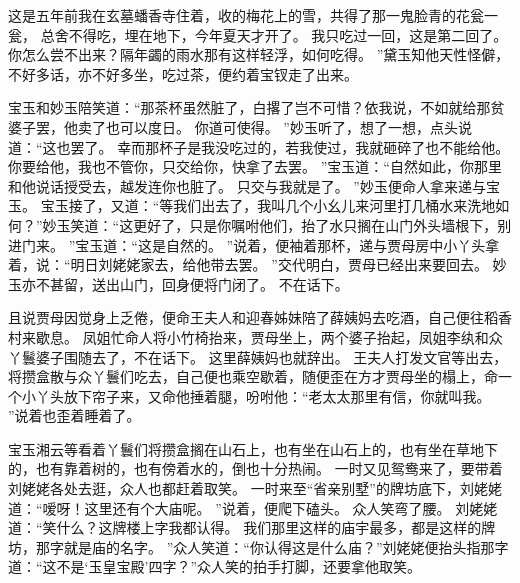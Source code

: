 这是五年前我在玄墓蟠香寺住着，收的梅花上的雪，共得了那一鬼脸青的花瓮一瓮，
总舍不得吃，埋在地下，今年夏天才开了。
我只吃过一回，这是第二回了。
你怎么尝不出来？隔年蠲的雨水那有这样轻浮，如何吃得。
”黛玉知他天性怪僻，不好多话，亦不好多坐，吃过茶，便约着宝钗走了出来。
\par
{}
宝玉和妙玉陪笑道：“那茶杯虽然脏了，白撂了岂不可惜？依我说，不如就给那贫婆子罢，他卖了也可以度日。
你道可使得。
”妙玉听了，想了一想，点头说道：“这也罢了。
幸而那杯子是我没吃过的，若我使过，我就砸碎了也不能给他。
你要给他，我也不管你，只交给你，快拿了去罢。
”宝玉道：“自然如此，你那里和他说话授受去，越发连你也脏了。
只交与我就是了。
”妙玉便命人拿来递与宝玉。
宝玉接了，又道：“等我们出去了，我叫几个小幺儿来河里打几桶水来洗地如何？”妙玉笑道：“这更好了，只是你嘱咐他们，抬了水只搁在山门外头墙根下，别进门来。
”宝玉道：“这是自然的。
”说着，便袖着那杯，递与贾母房中小丫头拿着，说：“明日刘姥姥家去，给他带去罢。
”交代明白，贾母已经出来要回去。
妙玉亦不甚留，送出山门，回身便将门闭了。
不在话下。
\par
且说贾母因觉身上乏倦，便命王夫人和迎春姊妹陪了薛姨妈去吃酒，自己便往稻香村来歇息。
凤姐忙命人将小竹椅抬来，贾母坐上，两个婆子抬起，凤姐李纨和众丫鬟婆子围随去了，不在话下。
这里薛姨妈也就辞出。
王夫人打发文官等出去，将攒盒散与众丫鬟们吃去，自己便也乘空歇着，随便歪在方才贾母坐的榻上，命一个小丫头放下帘子来，又命他捶着腿，吩咐他：“老太太那里有信，你就叫我。
”说着也歪着睡着了。
\par
宝玉湘云等看着丫鬟们将攒盒搁在山石上，也有坐在山石上的，也有坐在草地下的，也有靠着树的，也有傍着水的，倒也十分热闹。
一时又见鸳鸯来了，要带着刘姥姥各处去逛，众人也都赶着取笑。
一时来至“省亲别墅”的牌坊底下，刘姥姥道：“嗳呀！这里还有个大庙呢。
”说着，便爬下磕头。
众人笑弯了腰。
刘姥姥道：“笑什么？这牌楼上字我都认得。
我们那里这样的庙宇最多，都是这样的牌坊，那字就是庙的名字。
”众人笑道：“你认得这是什么庙？”刘姥姥便抬头指那字道：“这不是‘玉皇宝殿’四字？”众人笑的拍手打脚，还要拿他取笑。
